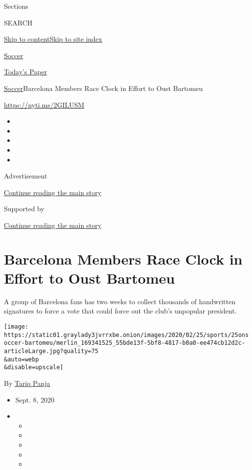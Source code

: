 Sections

SEARCH

\protect\hyperlink{site-content}{Skip to
content}\protect\hyperlink{site-index}{Skip to site index}

\href{https://www.nytimes3xbfgragh.onion/section/sports/soccer}{Soccer}

\href{https://myaccount.nytimes3xbfgragh.onion/auth/login?response_type=cookie\&client_id=vi}{}

\href{https://www.nytimes3xbfgragh.onion/section/todayspaper}{Today's
Paper}

\href{/section/sports/soccer}{Soccer}\textbar{}Barcelona Members Race
Clock in Effort to Oust Bartomeu

\url{https://nyti.ms/2GILUSM}

\begin{itemize}
\item
\item
\item
\item
\item
\end{itemize}

Advertisement

\protect\hyperlink{after-top}{Continue reading the main story}

Supported by

\protect\hyperlink{after-sponsor}{Continue reading the main story}

\hypertarget{barcelona-members-race-clock-in-effort-to-oust-bartomeu}{%
\section{Barcelona Members Race Clock in Effort to Oust
Bartomeu}\label{barcelona-members-race-clock-in-effort-to-oust-bartomeu}}

A group of Barcelona fans has two weeks to collect thousands of
handwritten signatures to force a vote that could force out the club's
unpopular president.

\texttt{[image: https://static01.graylady3jvrrxbe.onion/images/2020/02/25/sports/25onsoccer-bartomeu/merlin\_169341525\_55bde13f-5bf8-4817-b0a0-ee474cb12d2c-articleLarge.jpg?quality=75\\\&auto=webp\\\&disable=upscale]}

By \href{https://www.nytimes3xbfgragh.onion/by/tariq-panja}{Tariq Panja}

\begin{itemize}
\item
  Sept. 8, 2020
\item
  \begin{itemize}
  \item
  \item
  \item
  \item
  \item
  \end{itemize}
\end{itemize}

